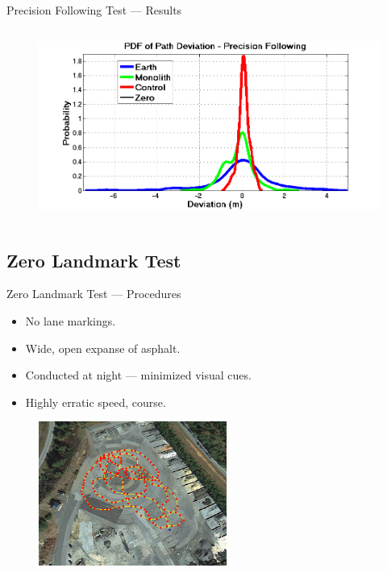 \documentclass{beamer}
\begin{document}
\begin{frame}{Precision Following Test --- Results}
\begin{columns}
\begin{column}{0.5\textwidth}
\begin{figure}
          \end{figure}
          \vspace{-20pt}
          \begin{figure}
            \includegraphics[width=\textwidth]{../graphics/precision_following_dev_pdf.png}
          \end{figure}
        \end{column}
      \end{columns}
    \end{frame}



  \subsection{Zero Landmark Test}
    \begin{frame}{Zero Landmark Test --- Procedures}
      \begin{itemize}
        \item No lane markings.
        \item Wide, open expanse of asphalt.
        \item Conducted at night --- minimized visual cues.
        \item Highly erratic speed, course.
      \end{itemize}
      \begin{figure}
        \centering
        \includegraphics[width=0.55\textwidth]{../graphics/zero_landmark_path.png}
      \end{figure}     
    \end{frame}
\end{document}
